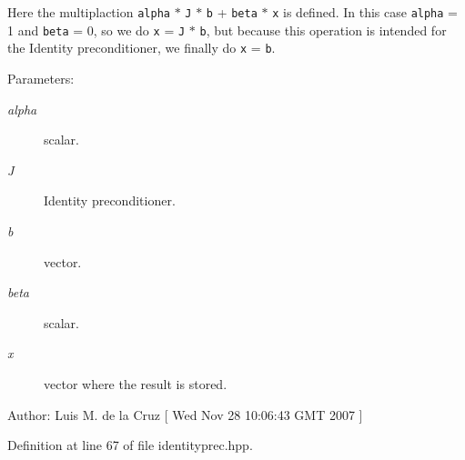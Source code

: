 Here the multiplaction {\tt alpha} $\ast$ {\tt J} $\ast$ {\tt b} + {\tt beta} $\ast$ {\tt x} is defined. In this case {\tt alpha} = 1 and {\tt beta} = 0, so we do {\tt x} = {\tt J} $\ast$ {\tt b}, but because this operation is intended for the Identity preconditioner, we finally do {\tt x} = {\tt b}. \begin{Desc}
\item[Parameters:]
\begin{description}
\item[{\em alpha}]scalar. \item[{\em J}]Identity preconditioner. \item[{\em b}]vector. \item[{\em beta}]scalar. \item[{\em x}]vector where the result is stored. \end{description}
\end{Desc}
\begin{Desc}
\item[Author:]Luis M. de la Cruz \mbox{[} Wed Nov 28 10:06:43 GMT 2007 \mbox{]} \end{Desc}


Definition at line 67 of file identityprec.hpp.